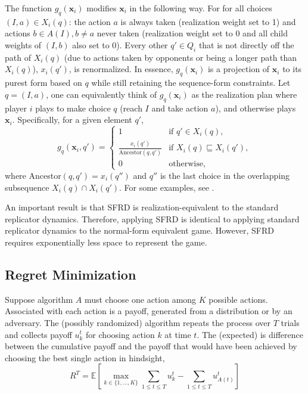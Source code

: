 \documentclass{aamas2014}
\newcommand{\bE}{\mathbb{E}}
\newcommand{\bx}{\mathbf{x}}
\newcommand{\defword}[1]{\textbf{\boldmath{#1}}}
\begin{document}
The function $g_q(\bx_i)$ modifies $\bx_i$ in the following way. 
For for all choices $(I,a) \in X_i(q)$: the action $a$ is always taken (realization weight
set to 1) and actions $b \in A(I), b \not= a$ never taken (realization weight set to 0 and all child weights of $(I,b)$ also set to 0). 
Every other $q' \in Q_i$ that is not directly off the path of $X_i(q)$ (due to actions taken by opponents or being a longer path than $X_i(q)$),
$x_i(q')$, is renormalized. 
In essence, $g_q(\bx_i)$ is a projection of $\bx_i$ to its purest form based on $q$ 
while still retaining the sequence-form constraints. 
Let $q = (I,a)$, one can equivalently think of $g_q(\bx_i)$ as the realization plan where player $i$ plays to make choice $q$ 
(reach $I$ and take action $a$), and otherwise plays $\bx_i$. 
Specifically, for a given element $q'$, 
\begin{equation}
\label{eq:gdef}
g_q(\bx_i, q') = \left\{ \begin{array}{ll}
  1                                                   & \mbox{if $q' \in X_i(q)$}, \\
\frac{x_i(q')}{\mbox{Ancestor}(q, q')}    & \mbox{if $X_i(q) \sqsubseteq X_i(q')$}, \\  
  0                                                   & \mbox{otherwise}, \end{array} \right.
\end{equation}
where Ancestor$(q, q') = x_i(q'')$ and $q''$ is the last choice in the overlapping subsequence  
$X_i(q) \cap X_i(q')$. For some examples, see \cite{Gatti13Efficient}. 

An important result is that SFRD is realization-equivalent to the standard replicator dynamics. Therefore, applying SFRD is identical 
to applying standard replicator dynamics to the normal-form equivalent game. However, SFRD requires exponentially less space to represent
the game. 

\subsection{Regret Minimization}
\label{sec:regmin}

Suppose algorithm $A$ must choose one action among $K$ possible actions. 
Associated with each action is a payoff, generated from a distribution or by an adversary. 
The (possibly randomized) algorithm repeats the process over $T$ trials and collects payoff $u_k^t$ for choosing 
action $k$ at time $t$. 
The (expected) \defword{regret} is difference between the cumulative payoff and the payoff that would 
have been achieved by choosing the best single action in hindsight, 
\begin{equation}
\label{eq:regret}
R^T = \bE \left[ \max_{k \in \{1, \ldots, K\}} \sum_{1 \le t \le T} u_k^t - \sum_{1 \le t \le T} u_{A(t)}^t \right]
\end{equation}
\end{document}
